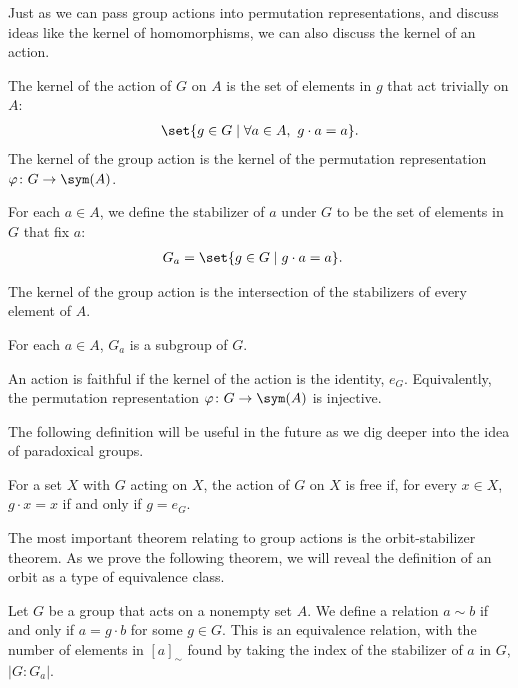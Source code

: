 Just as we can pass group actions into permutation representations, and discuss ideas like the kernel of homomorphisms, we can also discuss the kernel of an action.
\begin{definition}[Kernel]
  The {kernel} of the action of $G$ on $A$ is the set of elements in $g$ that act trivially on $A$:
  \begin{align*}
    \set{g\in G\mid \forall a\in A,~g\cdot a = a}.
  \end{align*}
  The kernel of the group action is the kernel of the permutation representation $\varphi\colon G\rightarrow \sym(A)$.
\end{definition}
\begin{definition}[Stabilizer]
  For each $a\in A$, we define the {stabilizer} of $a$ under $G$ to be the set of elements in $G$ that fix $a$:
  \begin{align*}
    G_a &= \set{g\in G\mid g\cdot a = a}.
  \end{align*}
\end{definition}
\begin{remark}
The kernel of the group action is the intersection of the stabilizers of every element of $A$.\newline

For each $a\in A$, $G_{a}$ is a subgroup of $G$.
\end{remark}
\begin{definition}
  An action is {faithful} if the kernel of the action is the identity, $e_G$. Equivalently, the permutation representation $\varphi\colon G\rightarrow \sym(A)$ is injective.
\end{definition}
The following definition will be useful in the future as we dig deeper into the idea of paradoxical groups.
\begin{definition}
For a set $X$ with $G$ acting on $X$, the action of $G$ on $X$ is free if, for every $x\in X$, $g\cdot x = x$ if and only if $g = e_G$.
\end{definition}
The most important theorem relating to group actions is the orbit-stabilizer theorem. As we prove the following theorem, we will reveal the definition of an orbit as a type of equivalence class.
\begin{theorem}
  Let $G$ be a group that acts on a nonempty set $A$. We define a relation $a\sim b$ if and only if $a = g\cdot b$ for some $g\in G$. This is an equivalence relation, with the number of elements in $\left[a\right]_{\sim}$ found by taking the index of the stabilizer of $a$ in $G$, $\left\vert G:G_a \right\vert$.
\end{theorem}
